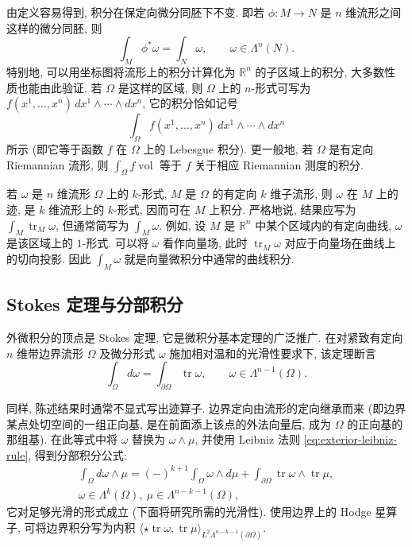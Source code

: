 {由定义容易得到, 积分在保定向微分同胚下不变. 即若 $\phi:M\to N$ 是 $n$ 维流形之间这样的微分同胚, 则}
\begin{equation}\label{eq:integration-pullback-invariance}
\int_M\phi^*\omega=\int_N\omega,\qquad\omega\in\Lambda^n(N).
\end{equation}
{特别地, 可以用坐标图将流形上的积分计算化为 $\mathbb R^n$ 的子区域上的积分, 大多数性质也能由此验证. 若 $\Omega$ 是这样的区域, 则 $\Omega$ 上的 $n$-形式可写为 $f(x^1,\ldots,x^n)\,dx^1\wedge\cdots\wedge dx^n$, 它的积分恰如记号}
\[
\int_\Omega f(x^1,\ldots,x^n)\,dx^1\wedge\cdots\wedge dx^n
\]
{所示 (即它等于函数 $f$ 在 $\Omega$ 上的 Lebesgue 积分). 更一般地, 若 $\Omega$ 是有定向 Riemannian 流形, 则 $\int_\Omega f\operatorname{vol}$ 等于 $f$ 关于相应 Riemannian 测度的积分.}

{若 $\omega$ 是 $n$ 维流形 $\Omega$ 上的 $k$-形式, $M$ 是 $\Omega$ 的有定向 $k$ 维子流形, 则 $\omega$ 在 $M$ 上的迹, 是 $k$ 维流形上的 $k$-形式, 因而可在 $M$ 上积分. 严格地说, 结果应写为 $\int_M\operatorname{tr}_M\omega$, 但通常简写为 $\int_M\omega$. 例如, 设 $M$ 是 $\mathbb R^n$ 中某个区域内的有定向曲线, $\omega$ 是该区域上的 $1$-形式. 可以将 $\omega$ 看作向量场, 此时 $\operatorname{tr}_M\omega$ 对应于向量场在曲线上的切向投影. 因此 $\int_M\omega$ 就是向量微积分中通常的曲线积分.}

\subsection{{Stokes 定理与分部积分}}\label{subsec:stokes-integration-by-parts}

{外微积分的顶点是 Stokes 定理, 它是微积分基本定理的广泛推广. 在对紧致有定向 $n$ 维带边界流形 $\Omega$ 及微分形式 $\omega$ 施加相对温和的光滑性要求下, 该定理断言}
\[
\int_\Omega d\omega=\int_{\partial\Omega}\operatorname{tr}\omega,\qquad\omega\in\Lambda^{n-1}(\Omega).
\]

{同样, 陈述结果时通常不显式写出迹算子. 边界定向由流形的定向继承而来 (即边界某点处切空间的一组正向基, 是在前面添上该点的外法向量后, 成为 $\Omega$ 的正向基的那组基).}
{在此等式中将 $\omega$ 替换为 $\omega\wedge\mu$, 并使用 Leibniz 法则 \eqref{eq:exterior-leibniz-rule}, 得到分部积分公式:}
\begin{equation}\label{eq:differential-forms-integration-by-parts}
\begin{gathered}
\int_\Omega d\omega\wedge\mu=(-)^{k+1}\int_\Omega\omega\wedge d\mu+\int_{\partial\Omega}\operatorname{tr}\omega\wedge\operatorname{tr}\mu,\\
\omega\in\Lambda^k(\Omega),\ \mu\in\Lambda^{n-k-1}(\Omega),
\end{gathered}
\end{equation}
{它对足够光滑的形式成立 (下面将研究所需的光滑性). 使用边界上的 Hodge 星算子, 可将边界积分写为内积 $\langle\star\operatorname{tr}\omega,\operatorname{tr}\mu\rangle_{L^2\Lambda^{n-k-1}(\partial\Omega)}$.}

